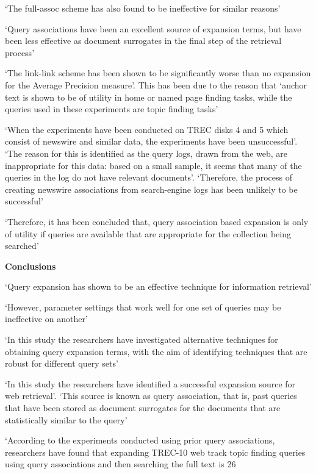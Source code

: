 \documentclass[]{article}
\begin{document}
{{‘The full-assoc scheme has also found to be ineffective for similar reasons’

‘Query associations have been an excellent source of expansion terms, but have been less effective as document surrogates in the final step of the retrieval process’

‘The link-link scheme has been shown to be significantly worse than no expansion for the Average Precision measure’. This has been due to the reason that ‘anchor text is shown to be of utility in home or named page finding tasks, while the queries used in these experiments are topic finding tasks’

‘When the experiments have been conducted on TREC disks 4 and 5 which consist of newswire and similar data, the experiments have been unsuccessful’. ‘The reason for this is identified as the query logs, drawn from the web, are inappropriate for this data: based on a small sample, it seems that many of the queries in the log do not have relevant documents’. ‘Therefore, the process of creating newswire associations from search-engine logs has been unlikely to be successful’

‘Therefore, it has been concluded that, query association based expansion is only of utility if queries are available that are appropriate for the collection being searched’ 

\textbf{Conclusions}

‘Query expansion has shown to be an effective technique for information retrieval’

‘However, parameter settings that work well for one set of queries may be ineffective on another’

‘In this study the researchers have investigated alternative techniques for obtaining query expansion terms, with the aim of identifying techniques that are robust for different query sets’

‘In this study the researchers have identified a successful expansion source for web retrieval’. ‘This source is known as query association, that is, past queries that have been stored as document surrogates for the documents that are statistically similar to the query’

‘According to the experiments conducted using prior query associations, researchers have found that expanding TREC-10 web track topic finding queries using query associations and then searching the full text is 26%

}}
\end{document}
